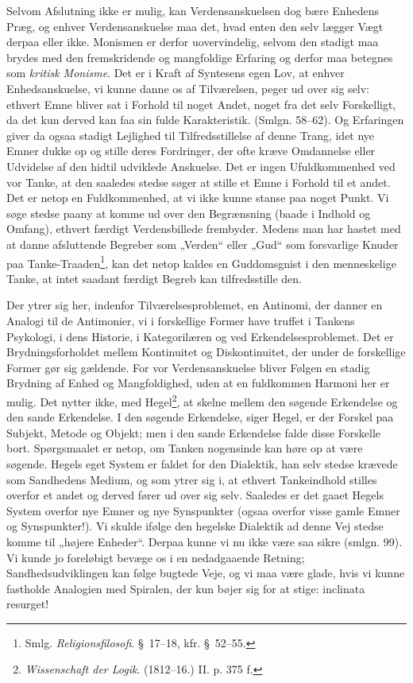 \documentclass[12pt,a4paper]{book}
\newcommand{\opage}[1]{\marginnote{\footnotesize\textit{[#1]}}}
\newcommand{\apage}[1]{\marginnote{\footnotesize\textit{[#1]}}}
\begin{document}
Selvom Afslutning ikke er mulig, kan Verdensanskuelsen dog bære Enhedens Præg, og enhver
Verdensanskuelse maa det, hvad enten den selv lægger Vægt derpaa eller ikke. Monismen er
derfor uovervindelig, selvom den stadigt maa \apage{322} brydes med den fremskridende og mangfoldige
Erfaring og derfor maa betegnes som \emph{kritisk Monisme}. Det er i Kraft af Syntesens
egen Lov, at enhver Enhedsanskuelse, vi kunne danne os af Tilværelsen, peger ud over sig
selv: ethvert Emne bliver sat i Forhold til noget Andet, noget fra det selv Forskelligt,
da det kun derved kan faa sin fulde Karakteristik. (Smlgn. 58--62). Og Erfaringen giver
da ogsaa stadigt Lejlighed til Tilfredsstillelse af denne Trang, idet nye Emner dukke op
og stille deres Fordringer, der ofte kræve Omdannelse eller Udvidelse af den hidtil
udviklede Anskuelse. Det er ingen Ufuldkommenhed ved vor Tanke, at den saaledes stedse
søger at stille et Emne i Forhold til et andet. Det er netop en Fuldkommenhed, at vi ikke
kunne stanse paa noget Punkt. Vi søge stedse paany at komme ud over den Begrænsning
(baade i Indhold og Omfang), ethvert færdigt Verdensbillede frembyder. Medens man har
hastet med at danne afsluttende Begreber som „Verden“ eller „Gud“ som forsvarlige Knuder paa
Tanke-Traaden\footnote{Smlg. \emph{Religionsfilosofi}. \S\ 17--18, kfr. \S\ 52--55.},
kan det netop kaldes en Guddomsgnist i den menneskelige Tanke, at intet saadant færdigt
Begreb kan tilfredsstille den.

Der ytrer sig her, indenfor Tilværelsesproblemet, en Antinomi, der danner en Analogi til
de Antimonier, vi i forskellige Former have truffet i Tankens Psykologi, i dens Historie,
i Kategorilæren og ved Erkendelsesproblemet. Det er Brydningsforholdet mellem Kontinuitet
og Diskontinuitet, der under de forskellige Former gør sig gældende. For vor
Verdensanskuelse bliver Følgen en stadig Brydning af Enhed og Mangfoldighed, uden at en
fuldkommen Harmoni her er mulig. Det nytter ikke, med Hegel\footnote{\emph{Wissenschaft
der Logik}. (1812--16.) II. p. 375 f.}, at skelne mellem den søgende Erkendelse og den
sande Erkendelse. I den søgende Erkendelse, siger Hegel, er der Forskel paa Subjekt,
Metode og Objekt; men i den sande Erkendelse falde disse Forskelle bort. Spørgsmaalet er
netop, om Tanken nogensinde kan høre op at være søgende. Hegels eget System er faldet for
den Dialektik, han selv stedse krævede som Sand\opage{323}hedens Medium, og som ytrer sig i, at
ethvert Tankeindhold stilles overfor et andet og derved fører ud over sig selv. Saaledes
er det gaaet Hegels System overfor nye Emner og nye Synspunkter (ogsaa overfor visse
gamle Emner og Synspunkter!). Vi skulde ifølge den hegelske Dialektik ad denne Vej stedse
komme til „højere Enheder“. Derpaa kunne vi nu ikke være saa sikre (smlgn. 99). Vi kunde
jo foreløbigt bevæge os i en nedadgaaende Retning; Sandhedsudviklingen kan følge bugtede
Veje, og vi maa være glade, hvis vi kunne fastholde Analogien med Spiralen, der kun bøjer
sig for at stige: inclinata resurget!
\end{document}
